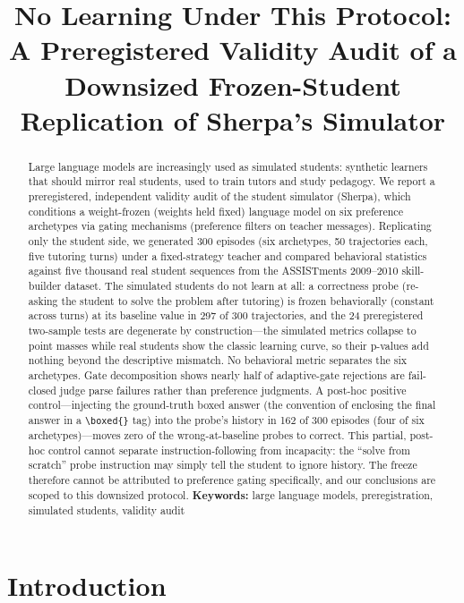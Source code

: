 \documentclass[notitlepage,12pt]{jedm}
\title{No Learning Under This Protocol:\\A Preregistered Validity Audit of a Downsized Frozen-Student Replication of Sherpa's Simulator}
\author{}   %
\date{}
\begin{document}
\maketitle

\begin{abstract}
\noindent Large language models are increasingly used as simulated students:
synthetic learners that should mirror real students, used to train
tutors and study pedagogy. We report a preregistered, independent validity audit of the student
simulator (Sherpa), which conditions a weight-frozen (weights held fixed) language model on six
preference archetypes via gating mechanisms (preference filters on teacher
messages). Replicating only the student
side, we generated 300 episodes (six archetypes, 50 trajectories each, five
tutoring turns) under a fixed-strategy teacher and compared behavioral
statistics against five thousand real student sequences from the
ASSISTments 2009--2010 skill-builder dataset. The simulated students
do not learn at all: a correctness probe (re-asking the student to solve the
problem after tutoring) is frozen behaviorally (constant
across turns) at its baseline value in 297
of 300 trajectories, and the 24 preregistered two-sample tests are
degenerate by construction---the simulated metrics collapse to point masses
while real students show the classic learning curve, so their p-values add
nothing beyond the descriptive mismatch. No behavioral metric
separates the six archetypes. Gate decomposition shows nearly
half of adaptive-gate rejections are fail-closed judge parse failures
rather than preference judgments. A post-hoc positive control---injecting
the ground-truth boxed answer (the convention of
enclosing the final answer in a \texttt{\textbackslash boxed\{\}} tag)
into the probe's history in 162 of 300 episodes (four of six archetypes)---moves
zero of the wrong-at-baseline probes to correct. This partial, post-hoc
control cannot separate instruction-following from incapacity: the
``solve from scratch'' probe instruction may simply tell the student to
ignore history. The freeze therefore cannot be attributed
to preference gating specifically, and our conclusions are scoped to this
downsized protocol.
{\parindent0pt
\textbf{Keywords:} large language models, preregistration, simulated students, validity audit
}
\end{abstract}

\section{Introduction}
\end{document}
